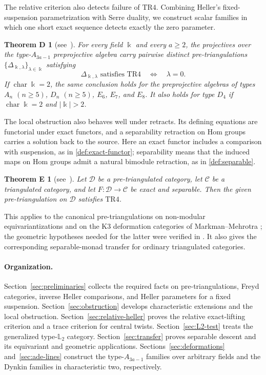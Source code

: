 \documentclass[a4paper,11pt,reqno]{amsart}
\theoremstyle{definition}
\theoremstyle{plain}
\newtheorem*{maintheoremd}{Theorem D}
\newtheorem*{maintheoreme}{Theorem E}
\numberwithin{equation}{section}
\newcommand{\C}{\mathcal C}
\newcommand{\D}{\mathcal D}
\newcommand{\kk}{\Bbbk}
\begin{document}
The relative criterion also detects failure of $\mathrm{TR4}$.  Combining
Heller's fixed-suspension parametrization with Serre duality, we construct
scalar families in which one short exact sequence detects exactly the zero
parameter.

\begin{maintheoremd}[{\normalfont see~}]
For every field $\kk$ and every $a\ge2$, the projectives over the
type-$A_{3a-1}$ preprojective algebra carry pairwise distinct
pre-triangulations
$\{\Delta_{\kk,\lambda}\}_{\lambda\in\kk}$ satisfying
\[
 \Delta_{\kk,\lambda}\text{ satisfies }\mathrm{TR4}
 \quad\Longleftrightarrow\quad\lambda=0.
\]
If $\operatorname{char}\kk=2$, the same conclusion holds for the
preprojective algebras of types
$A_n$ $(n\ge5)$, $D_n$ $(n\ge5)$, $E_6$, $E_7$, and $E_8$.
It also holds for type $D_4$ if $\operatorname{char}\kk=2$ and $|\kk|>2$.
\end{maintheoremd}

The local obstruction also behaves well under retracts.  Its defining
equations are functorial under exact functors, and a separability retraction
on Hom groups carries a solution back to the source.
Here an exact functor includes a comparison with suspension, as in
\cref{def:exact-functor}; separability means that the induced maps on Hom
groups admit a natural bimodule retraction, as in \cref{def:separable}.

\begin{maintheoreme}[{\normalfont see~}]
Let \(\D\) be a pre-triangulated category, let \(\C\) be a triangulated
category, and let \(F:\D\to\C\) be exact and separable.  Then the given
pre-triangulation on \(\D\) satisfies \(\mathrm{TR4}\).
\end{maintheoreme}

This applies to the canonical pre-triangulations on non-modular
equivariantizations \cite{Sun2019} and on the K3 deformation categories of
Markman--Mehrotra \cite{MarkmanMehrotra2015}; the geometric hypotheses
needed for the latter were verified in
\cite[Theorem~1.11]{MarkmanMehrotraVerbitsky2019}.  It also gives the
corresponding separable-monad transfer for ordinary triangulated
categories.

\paragraph{Organization.}
Section~\ref{sec:preliminaries} collects the required facts on
pre-triangulations, Freyd categories, inverse Heller comparisons, and
Heller parameters for a fixed suspension.  Section~\ref{sec:obstruction}
develops characteristic extensions and the local obstruction.
Section~\ref{sec:relative-heller} proves the relative exact-lifting
criterion and a trace criterion for central twists.  Section~\ref{sec:L2-test}
treats the generalized type-$\mathbb L_2$ category.
Section~\ref{sec:transfer} proves separable descent and its equivariant and
geometric applications.  Sections~\ref{sec:deformations}
and~\ref{sec:ade-lines} construct the type-$A_{3a-1}$ families over
arbitrary fields and the Dynkin families in characteristic two, respectively.
\end{document}
